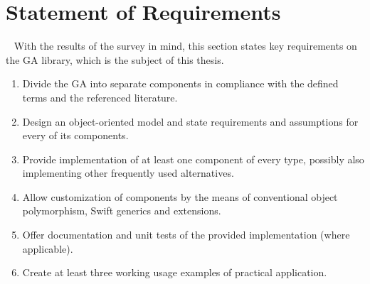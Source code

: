 \section{Statement of Requirements}~\label{section:requirements}
With the results of the survey in mind, this section states key requirements on the GA library, which is the subject of this thesis.
~
\begin{enumerate}
	\item
	Divide the GA into separate components in compliance with the defined terms and the referenced literature.

	\item
	Design an object-oriented model and state requirements and assumptions for every of its components.

	\item 
	Provide implementation of at least one component of every type, possibly also implementing other frequently used alternatives.

	\item 
	Allow customization of components by the means of conventional object polymorphism, Swift generics and extensions.

	\item
	Offer documentation and unit tests of the provided implementation (where applicable).

	\item
	Create at least three working usage examples of practical application.
\end{enumerate}
